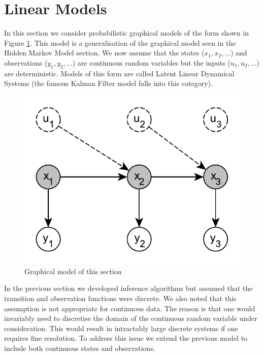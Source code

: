 \documentclass[../masters.tex]{subfiles}
\begin{document}
\graphicspath{{./imgs/}{../imgs/}} %

\section{Linear Models}
In this section we consider probabilistic graphical models of the form shown in Figure \ref{fig_linmod2}. This model is a generalisation of the graphical model seen in the Hidden Markov Model section. We now assume that the states ($x_1,x_2,...$) and observations ($y_1,y_2,...$) are continuous random variables but the inputs ($u_1,u_2,...$) are deterministic. Models of this form are called Latent Linear Dynamical Systems (the famous Kalman Filter model falls into this category).
\begin{figure}[H] 
\centering
\includegraphics[scale=1.0]{linear_model.pdf}
\caption{Graphical model of this section}
\label{fig_linmod2}
\end{figure}
In the previous section we developed inference algorithms but assumed that the transition and observation functions were discrete. We also noted that this assumption is not appropriate for continuous data. The reason is that one would invariably need to discretise the domain of the continuous random variable under consideration. This would result in intractably large discrete systems if one requires fine resolution. To address this issue we extend the previous model to include both continuous states and observations. 
\end{document}
